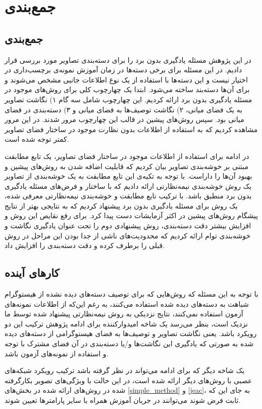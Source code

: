 \chapter{جمع‌بندی} \label{chap:conclusion}
\section{جمع‌بندی}
در این پژوهش مسئله یادگیری بدون برد را برای دسته‌بندی تصاویر مورد بررسی قرار دادیم. در این مسئله برای برخی دسته‌ها در زمان آموزش نمونه‌ی برچسب‌داری در اختیار نیست و این دسته‌ها با استفاده از یک نوع اطلاعات جانبی مشخص می‌شوند و برای آن‌ها دسته‌بند ساخته می‌شود. ابتدا یک چهارچوب کلی برای روش‌های موجود در مسئله یادگیری بدون برد ارائه کردیم. این چهارچوب شامل سه گام ۱) نگاشت تصاویر به یک فضای میانی، ۲) نگاشت توصیف‌ها به فضای میانی و ۳) دسته‌بندی در فضای میانی بود. سپس روش‌های پیشین در قالب این چهارچوب مرور شدند. در این مرور مشاهده کردیم که به استفاده از اطلاعات بدون نظارت موجود در ساختار فضای تصاویر کمتر توجه شده است. 

در ادامه برای استفاده از اطلاعات موجود در ساختار فضای تصاویر، یک تابع مطابقت مبتنی بر خوشه‌بندی تصاویر بیان کردیم که قابلیت اضافه شدن به روش‌های پیشین و بهبود آن‌ها را داراست. با توجه به تکیه‌ی این تابع مطابقت به یک خوشه‌بندی از تصاویر یک روش خوشه‌بندی نیمه‌نظارتی ارائه دادیم که با ساختار و فرض‌های مسئله یادگیری بدون برد منطبق باشد.  با ترکیب تابع مطابقت و خوشه‌بندی نیمه‌نظارتی معرفی شده، یک روش برای مسئله یادگیری بدون برد پیشنهاد کردیم که به نتایجی بهتر از نتایج پیشگام روش‌های پیشین در اکثر آزمایشات دست پیدا کرد. برای رفع نقایص این روش و  افزایش بیشتر دقت دسته‌بندی، روش پیشنهادی دوم را تحت عنوان یادگیری نگاشت و خوشه‌بندی توام ارائه کردیم که محدودیت‌های ناشی از جدا بودن این مراحل در روش قبلی را برطرف کرده و دقت دسته‌بندی را افزایش داد. 
\section{کار‌های آینده}
با توجه به این مسئله که روش‌هایی که برای توصیف دسته‌های دیده نشده از هیستوگرام شباهت به دسته‌های دیده شده استفاده می‌کنند، به رغم این‌که از اطلاعات نمونه‌های آزمون استفاده نمی‌کنند، نتایج نزدیکی به روش نیمه‌نظارتی پیشنهاد شده توسط ما نزدیک است، بنظر می‌رسد یک شاخه امیدوارکننده برای ادامه پژوهش ترکیب این دو رویکرد باشد. یعنی نگاشت تصاویر و توصیف‌ها به فضای هیستوگرامی از دسته‌های دیده شده به صورتی که یادگیری این نگاشت‌ها و/یا دسته‌بندی در آن فضای مشترک با توجه و استفاده از نمونه‌های آزمون باشد.

یک شاخه دیگر که برای ادامه می‌تواند در نظر گرفته باشد ترکیب رویکرد شبکه‌های عصبی با روش‌های دیگر ارائه شده است، در این حالت با ویژگی‌های تصویر بکارگرفته شده در روش‌های ارائه شده در بخش‌های
\ref{simple_method}
و \ref{jeac}، به جای این که ثابت فرض شوند می‌توانند در جریان آموزش همراه با سایر پارامترها تعیین شوند.

